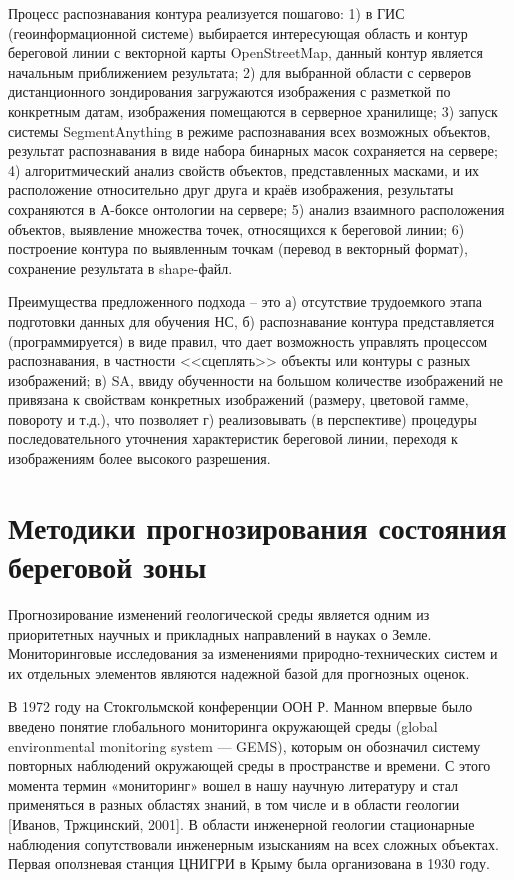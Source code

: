 \documentclass[732,14pt,final]{studrep}
\begin{document}
Процесс распознавания контура реализуется пошагово: 1) в ГИС (геоинформационной системе) выбирается интересующая область и контур береговой линии с векторной карты OpenStreetMap, данный контур является начальным приближением результата; 2) для выбранной области с серверов дистанционного зондирования загружаются изображения с разметкой по конкретным датам, изображения помещаются в серверное хранилище; 3) запуск системы SegmentAnything в режиме распознавания всех возможных объектов, результат распознавания в виде набора бинарных масок сохраняется на сервере; 4) алгоритмический анализ свойств объектов, представленных масками, и их расположение относительно друг друга и краёв изображения, результаты сохраняются в А-боксе онтологии на сервере; 5) анализ взаимного расположения объектов, выявление множества точек, относящихся к береговой линии; 6) построение контура по выявленным точкам (перевод в векторный формат), сохранение результата в shape-файл.

Преимущества предложенного подхода -- это а) отсутствие трудоемкого этапа подготовки данных для обучения НС, б) распознавание контура представляется (программируется) в виде правил, что дает возможность управлять процессом распознавания, в частности <<сцеплять>> объекты или контуры с разных изображений; в) SA, ввиду обученности на большом количестве изображений не привязана к свойствам конкретных изображений (размеру, цветовой гамме, повороту и т.д.), что позволяет г) реализовывать (в перспективе) процедуры последовательного уточнения характеристик береговой линии, переходя к изображениям более высокого разрешения.

\chapter{Методики прогнозирования состояния береговой зоны}\label{chap:techniques}

Прогнозирование изменений геологической среды является одним из приоритетных научных и прикладных направлений в науках о Земле. Мониторинговые исследования за изменениями природно-технических систем и их отдельных элементов являются надежной базой для прогнозных оценок.

В 1972 году на Стокгольмской конференции ООН Р. Манном впервые было введено понятие глобального мониторинга окружающей среды (global environmental monitoring system — GEMS), которым он обозначил систему повторных наблюдений окружающей среды в пространстве и времени. С этого момента термин «мониторинг» вошел в нашу научную литературу и стал применяться в разных областях знаний, в том числе и в области геологии [Иванов, Тржцинский, 2001]. В области инженерной геологии стационарные наблюдения сопутствовали инженерным изысканиям на всех сложных объектах. Первая оползневая станция ЦНИГРИ в Крыму была организована в 1930 году.
\end{document}
